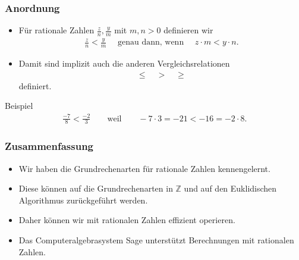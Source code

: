 \documentclass{beamer}
\newcommand\ZZ{\mathbb Z}
\renewcommand{\oe}{\"o}
\newcommand{\ue}{\"u}
\begin{document}
\begin{frame}\frametitle{Anordnung}
	\begin{block}{}
	\begin{itemize}
	\item F\ue r rationale Zahlen $\frac{z}{n},\frac{y}{m}$ mit $m,n>0$ definieren wir
		\begin{align*}
			\frac{z}{n}<\frac{y}{m}\quad\mbox{ genau dann, wenn }\quad z\cdot m<y\cdot n.
		\end{align*}
	\item Damit sind implizit auch die anderen Vergleichsrelationen
		\begin{align*}
		\leq\quad >\quad \geq
		\end{align*}
		definiert.
	\end{itemize}
	\end{block}
	\begin{block}{Beispiel}
	\begin{align*}
		\frac{-7}{8}<\frac{-2}{3}\qquad\mbox{weil}\qquad -7\cdot 3=-21<-16=-2\cdot 8.
	\end{align*}	
	\end{block}
\end{frame}

\begin{frame}\frametitle{Zusammenfassung}
\begin{itemize}
\item Wir haben die Grundrechenarten f\ue r rationale Zahlen kennengelernt.
\item Diese k\oe nnen auf die Grundrechenarten in $\ZZ$ und auf den Euklidischen Algorithmus zur\ue ckgef\ue hrt werden.
\item Daher k\oe nnen wir mit rationalen Zahlen effizient operieren.
\item Das Computeralgebrasystem Sage unterst\ue tzt Berechnungen mit rationalen Zahlen.
\end{itemize}
\end{frame}
\end{document}
